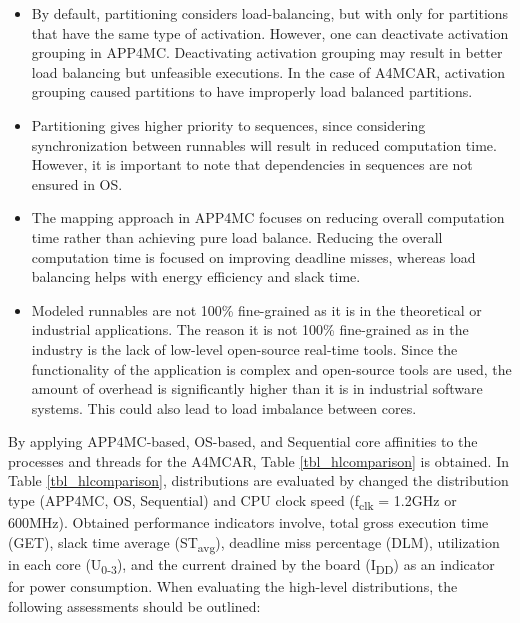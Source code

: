 \begin{itemize}
	\item By default, partitioning considers load-balancing, but with only for partitions that have the same type of activation. However, one can deactivate activation grouping in APP4MC. Deactivating activation grouping may result in better load balancing but unfeasible executions. In the case of A4MCAR, activation grouping caused partitions to have improperly load balanced partitions.
	\item Partitioning gives higher priority to sequences, since considering synchronization between runnables will result in reduced computation time. However, it is important to note that dependencies in sequences are not ensured in OS.
	\item The mapping approach in APP4MC focuses on reducing overall computation time rather than achieving pure load balance. Reducing the overall computation time is focused on improving deadline misses, whereas load balancing helps with energy efficiency and slack time.
	\item Modeled runnables are not 100\% fine-grained as it is in the theoretical or industrial applications. The reason it is not 100\% fine-grained as in the industry is the lack of low-level open-source real-time tools. Since the functionality of the application is complex and open-source tools are used, the amount of overhead is significantly higher than it is in industrial software systems. This could also lead to load imbalance between cores.
\end{itemize}

By applying APP4MC-based, OS-based, and Sequential core affinities to the processes and threads for the A4MCAR, Table \ref{tbl_hlcomparison} is obtained. In Table \ref{tbl_hlcomparison}, distributions are evaluated by changed the distribution type (APP4MC, OS, Sequential) and CPU clock speed (f\textsubscript{clk} = 1.2GHz or 600MHz). Obtained performance indicators involve, total gross execution time (GET), slack time average (ST\textsubscript{avg}), deadline miss percentage (DLM), utilization in each core (U\textsubscript{0-3}), and the current drained by the board (I\textsubscript{DD}) as an indicator for power consumption. When evaluating the high-level distributions, the following assessments should be outlined:

\hlcomparison

